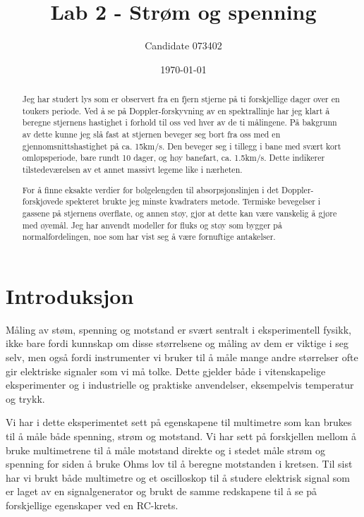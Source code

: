 \documentclass[reprint, english,notitlepage]{revtex4-1}  %
\begin{document}
\title{Lab 2 - Strøm og spenning}
\date{\today}
\author{Candidate 073402}


\newpage

\begin{abstract}
Jeg har studert lys som er observert fra en fjern stjerne på ti forskjellige dager over en toukers periode. Ved å se på Doppler-forskyvning av en spektrallinje har jeg klart å beregne stjernens hastighet i forhold til oss ved hver av de ti målingene. På bakgrunn av dette kunne jeg slå fast at stjernen beveger seg bort fra oss med en gjennomsnittshastighet på ca. 15km/s. Den beveger seg i tillegg i bane med svært kort omløpsperiode, bare rundt 10 dager, og høy banefart, ca. 1.5km/s. Dette indikerer tilstedeværelsen av et annet massivt legeme like i nærheten.

For å finne eksakte verdier for bølgelengden til absorpsjonslinjen i det Doppler-forskjøvede spekteret brukte jeg minste kvadraters metode. Termiske bevegelser i gassene på stjernens overflate, og annen støy, gjør at dette kan være vanskelig å gjøre med øyemål. Jeg har anvendt modeller for fluks og støy som bygger på normalfordelingen, noe som har vist seg å være fornuftige antakelser.
\end{abstract}
\maketitle                                %



\section{Introduksjon}

Måling av støm, spenning og motstand er svært sentralt i eksperimentell fysikk, ikke bare fordi kunnskap om disse størrelsene og måling av dem er viktige i seg selv, men også fordi instrumenter vi bruker til å måle mange andre størrelser ofte gir elektriske signaler som vi må tolke. Dette gjelder både i vitenskapelige eksperimenter og i industrielle og praktiske anvendelser, eksempelvis temperatur og trykk.

Vi har i dette eksperimentet sett på egenskapene til multimetre som kan brukes til å måle både spenning, strøm og motstand. Vi har sett på forskjellen mellom å bruke multimetrene til å måle motstand direkte og i stedet måle strøm og spenning for siden å bruke Ohms lov til å beregne motstanden i kretsen. Til sist har vi brukt både multimetre og et oscilloskop til å studere elektrisk signal som er laget av en signalgenerator og brukt de samme redskapene til å se på forskjellige egenskaper ved en RC-krets.
\end{document}
